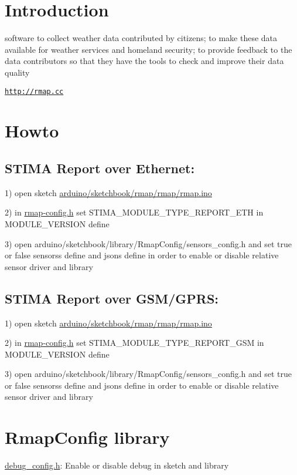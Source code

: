 \hypertarget{index_introduction}{}\section{Introduction}\label{index_introduction}
software to collect weather data contributed by citizens; to make these data available for weather services and homeland security; to provide feedback to the data contributors so that they have the tools to check and improve their data quality

\href{http://rmap.cc}{\tt http\+://rmap.\+cc}\hypertarget{index_howto}{}\section{Howto}\label{index_howto}
\hypertarget{index_report_eth}{}\subsection{S\+T\+I\+M\+A Report over Ethernet\+:}\label{index_report_eth}
1) open sketch \hyperlink{rmap_8ino}{arduino/sketchbook/rmap/rmap/rmap.\+ino}

2) in \hyperlink{rmap-config_8h}{rmap-\/config.\+h} set S\+T\+I\+M\+A\+\_\+\+M\+O\+D\+U\+L\+E\+\_\+\+T\+Y\+P\+E\+\_\+\+R\+E\+P\+O\+R\+T\+\_\+\+E\+TH in M\+O\+D\+U\+L\+E\+\_\+\+V\+E\+R\+S\+I\+ON define

3) open arduino/sketchbook/library/\+Rmap\+Config/sensors\+\_\+config.\+h and set true or false sensors\textquotesingle{}s define and json\textquotesingle{}s define in order to enable or disable relative sensor driver and library\hypertarget{index_report_gsm}{}\subsection{S\+T\+I\+M\+A Report over G\+S\+M/\+G\+P\+R\+S\+:}\label{index_report_gsm}
1) open sketch \hyperlink{rmap_8ino}{arduino/sketchbook/rmap/rmap/rmap.\+ino}

2) in \hyperlink{rmap-config_8h}{rmap-\/config.\+h} set S\+T\+I\+M\+A\+\_\+\+M\+O\+D\+U\+L\+E\+\_\+\+T\+Y\+P\+E\+\_\+\+R\+E\+P\+O\+R\+T\+\_\+\+G\+SM in M\+O\+D\+U\+L\+E\+\_\+\+V\+E\+R\+S\+I\+ON define

3) open arduino/sketchbook/library/\+Rmap\+Config/sensors\+\_\+config.\+h and set true or false sensors\textquotesingle{}s define and json\textquotesingle{}s define in order to enable or disable relative sensor driver and library\hypertarget{index_RmapConfig}{}\section{Rmap\+Config library}\label{index_RmapConfig}
\hyperlink{debug__config_8h}{debug\+\_\+config.\+h}\+: Enable or disable debug in sketch and library

